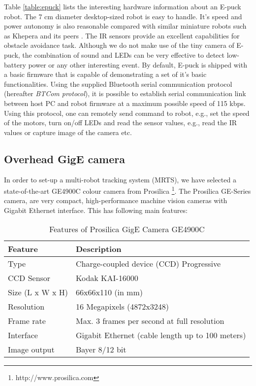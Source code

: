 Table \ref{table:epuck} lists the interesting hardware information about an E-puck robot. The 7 cm diameter desktop-sized robot is easy to handle. It's speed and power autonomy is also reasonable compared with similar miniature robots such as Khepera and its peers \cite{Mondada+2009}.  The IR sensors provide an excellent capabilities for obstacle avoidance task. Although we do not make use of the tiny camera of E-puck, the combination of sound and LEDs can be very effective to detect low-battery power or any other interesting event. By default, E-puck is shipped with a basic firmware that is capable of demonstrating a set of it's basic functionalities. Using the supplied Bluetooth serial communication protocol (hereafter {\em BTCom protocol}), it is possible to establish serial communication link between host PC and robot firmware at a maximum possible speed of 115 kbps.  Using this protocol, one can remotely send command to  robot, e.g., set the speed of the motors, turn on/off LEDs and read the sensor values, e.g., read the IR values or capture image of the camera etc.

\subsection{Overhead GigE camera}
In order to set-up a multi-robot tracking system (MRTS), we have selected a state-of-the-art GE4900C colour camera from Prosilica \footnote{http://www.prosilica.com}. The Prosilica GE-Series camera,  are very compact, high-performance machine vision cameras with Gigabit Ethernet interface. This has following main features:

\begin{table}
\caption{Features of Prosilica GigE Camera GE4900C}
\label{table:ge4900c}
\begin{center}
\begin{tabular}{|l||l|}
\hline \textbf{Feature} & \textbf{Description}\\
\hline Type & Charge-coupled device (CCD) Progressive\\
\hline CCD Sensor & Kodak KAI-16000\\
\hline Size (L x W x H) & 66x66x110  (in mm)\\
\hline Resolution & 16 Megapixels (4872x3248)\\ 
\hline Frame rate  & Max. 3 frames per second  at full resolution\\
\hline Interface & Gigabit Ethernet (cable length up to 100 meters)\\
\hline Image output & Bayer 8/12 bit\\
\hline
\end{tabular}
\end{center}
\end{table}

